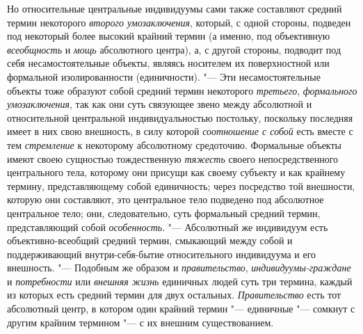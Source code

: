 Но относительные центральные индивидуумы сами также составляют
средний термин некоторого {\em второго
умозаключения}, который, с одной стороны, подведен под
некоторый более высокий крайний термин (а именно, под объективную
{\em всеобщность} и
{\em мощь} абсолютного
центра), а, с другой стороны, подводит под себя несамостоятельные объекты,
являясь носителем их поверхностной или формальной изолированности
(единичности).
"--- Эти несамостоятельные объекты тоже образуют
собой средний термин некоторого
{\em третьего},
{\em формального умозаключения},
так как они суть связующее звено между абсолютной и
относительной центральной индивидуальностью постольку, поскольку последняя
имеет в них свою внешность, в силу которой
{\em соотношение с собой}
есть вместе с тем
{\em стремление} к
некоторому абсолютному средоточию. Формальные объекты имеют своею сущностью
тождественную {\em тяжесть}
своего непосредственного центрального тела, которому они
присущи как своему субъекту и как крайнему термину, представляющему собой
единичность; через посредство той внешности, которую они составляют, это
центральное тело подведено под абсолютное центральное тело; они,
следовательно, суть формальный средний термин, представляющий собой
{\em особенность}.
"--- Абсолютный же индивидуум есть объективно-всеобщий средний
термин, смыкающий между собой и поддерживающий внутри-себя-бытие
относительного индивидуума и его
внешность.
"--- \label{bkm:bm52b}Подобным же образом и
{\em правительство},
{\em индивидуумы-граждане
}и {\em потребности}
или {\em внешняя жизнь}
единичных людей суть три термина, каждый из которых есть
средний термин для двух остальных.
{\em Правительство} есть
тот абсолютный центр, в котором один крайний термин
"--- единичные "--- сомкнут с другим крайним
термином "--- с их внешним
существованием.
